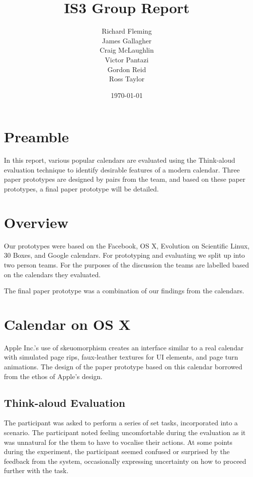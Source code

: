 \documentclass{article}
\title{IS3 Group Report}
\author{
  Richard Fleming \\
  James Gallagher \\
  Craig McLaughlin \\
  Victor Pantazi \\
  Gordon Reid \\
  Ross Taylor}
\date{\today}
\begin{document}

\maketitle


\section{Preamble}

In this report, various popular calendars are evaluated using the
Think-aloud evaluation technique to identify desirable features of a
modern calendar. Three paper prototypes are designed by pairs from the
team, and based on these paper prototypes, a final paper prototype will
be detailed.


\section{Overview}

Our prototypes were based on the Facebook, OS X, Evolution on Scientific
Linux, 30 Boxes, and Google calendars. For prototyping and evaluating
we split up into two person teams. For the purposes of the discussion
the teams are labelled based on the calendars they evaluated.

The final paper prototype was a combination of our findings from the
calendars.


\section{Calendar on OS X}

Apple Inc.'s use of skeuomorphism creates an interface similar to a real 
calendar with simulated page rips, faux-leather textures for UI
elements, and page turn animations. The design of the paper prototype
based on this calendar borrowed from the ethos of Apple's design.

\subsection{Think-aloud Evaluation}
The participant was asked to perform a series of set tasks, incorporated
into a scenario. The participant noted feeling uncomfortable during the
evaluation as it was unnatural for the them to have to vocalise their
actions. At some points during the experiment, the participant seemed
confused or surprised by the feedback from the system, occasionally
expressing uncertainty on how to proceed further with the task.
\end{document}

